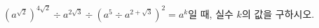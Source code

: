 $(a^{\sqrt{2}})^{4\sqrt{2}}\div a^{2\sqrt{3}}\div(a^5\div a^{2+\sqrt{3}})^2=a^k$일 때, 실수 $k$의 값을 구하시오. 
